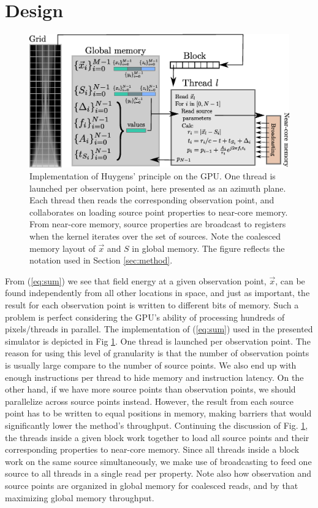 \section{Design}
\begin{figure}[!t]
\centering
\includegraphics[width=\textwidth]{img/huygens_gpu_layout.eps}
\caption{Implementation of Huygens' principle on the GPU. One thread is launched per observation point, here presented as an azimuth plane. Each thread then reads the corresponding observation point, and collaborates on loading source point properties to near-core memory. From near-core memory, source properties are broadcast to registers when the kernel iterates over the set of sources. Note the coalesced memory layout of $\vec{x}$ and $S$ in global memory. The figure reflects the notation used in Section \ref{sec:method}.}
\label{fig:huygens_gpu}
\end{figure}

From (\ref{eq:sum}) we see that field energy at a given observation point, $\vec{x}$, can be found independently from all other locations in space, and just as important, the result for each observation point is written to different bits of memory. Such a problem is perfect considering the GPU's ability of processing hundreds of pixels/threads in parallel. The implementation of (\ref{eq:sum}) used in the presented simulator is depicted in Fig \ref{fig:huygens_gpu}. One thread is launched per observation point. The reason for using this level of granularity is that the number of observation points is usually large compare to the number of source points. We also end up with enough instructions per thread to hide memory and instruction latency. On the other hand, if we have more source points than observation points, we should parallelize across source points instead. However, the result from each source point has to be written to equal positions in memory, making barriers that would significantly lower the method's throughput. Continuing the discussion of Fig. \ref{fig:huygens_gpu}, the threads inside a given block work together to load all source points and their corresponding properties to near-core memory. Since all threads inside a block work on the same source simultaneously, we make use of broadcasting to feed one source to all threads in a single read per property. Note also how observation and source points are organized in global memory for coalesced reads, and by that maximizing global memory throughput.

